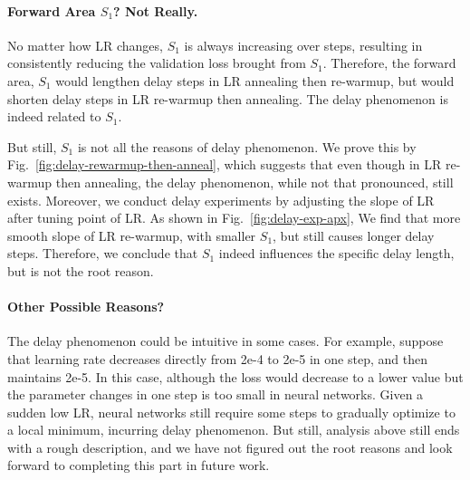 

\paragraph{Forward Area $S_1$? Not Really.} No matter how LR changes, $S_1$ is always increasing over steps, resulting in consistently reducing the validation loss brought from $S_1$. Therefore, the forward area, $S_1$ would lengthen delay steps in LR annealing then re-warmup, but would shorten delay steps in LR re-warmup then annealing. The delay phenomenon is indeed related to $S_1$.

But still, $S_1$ is not all the reasons of delay phenomenon. We prove this by Fig.~\ref{fig:delay-rewarmup-then-anneal}, which suggests that even though in LR re-warmup then annealing, the delay phenomenon, while not that pronounced, still exists. Moreover, we conduct delay experiments by adjusting the slope of LR after tuning point of LR. As shown in Fig.~\ref{fig:delay-exp-apx}, We find that more smooth slope of LR re-warmup, with smaller $S_1$, but still causes longer delay steps. Therefore, we conclude that $S_1$ indeed influences the specific delay length, but is not the root reason.

\paragraph{Other Possible Reasons?} The delay phenomenon could be intuitive in some cases. For example, suppose that learning rate decreases directly from 2e-4 to 2e-5 in one step, and then maintains 2e-5. In this case, although the loss would decrease to a lower value but the parameter changes in one step is too small in neural networks. Given a sudden low LR, neural networks still require some steps to gradually optimize to a local minimum, incurring delay phenomenon. 
But still, analysis above still ends with a rough description, and we have not figured out the root reasons and look forward to completing this part in future work.


